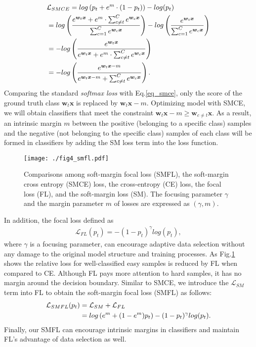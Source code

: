 \documentclass{article}
\begin{document}
{\myfont
	\begin{align}
	& \mathcal{L}_{SMCE}
	= log\left( p_t+e^m \cdot (1-p_t)\right)-log(p_t) \nonumber\\
	& = log\left( \frac{e^{\bm{w}_t\bm{x}}+e^m \cdot\sum_{c\neq t}^{C}e^{\bm{w}_c\bm{x}}}{\sum_{c=1}^{C} e^{\bm{w}_c\bm{x}}} \right) - log\left( \frac{e^{\bm{w}_t\bm{x}}}{\sum_{c=1}^{C} e^{\bm{w}_c\bm{x}}}\right) \notag\\
	& = -log \left( \frac{e^{\bm{w}_t\bm{x}}}{e^{\bm{w}_t\bm{x}}+e^m \cdot\sum_{c\neq t}^{C}e^{\bm{w}_c\bm{x}}}\right) \nonumber\\
	& = -log \left( \frac{e^{\bm{w}_t\bm{x}-m}}{e^{\bm{w}_t\bm{x}-m} + \sum_{c\neq t}^{C}e^{\bm{w}_c\bm{x}}}\right).
	\label{eq_smce}
	\end{align}
}Comparing the standard \textit{softmax loss} with Eq.\ref{eq_smce}, only the score of the ground truth class $ \bm{w}_t\bm{x} $ is replaced by $ \bm{w}_t\bm{x}-m $. Optimizing model with SMCE, we will obtain classifiers that meet the constraint {\myfont$ \bm{w}_t\bm{x}-m \geq \bm{w}_{c\neq t}\bm{x}  $}. As a result, an intrinsic margin $ m  $ between the positive (belonging to a specific class) samples and the negative (not belonging to the specific class) samples of each class will be formed in classifiers by adding the SM loss term into the loss function.

\begin{figure}[tbp]
	\centering
	\texttt{[image: ./fig4\_smfl.pdf]}
	\caption{Comparisons among soft-margin focal loss (SMFL), the soft-margin cross entropy (SMCE) loss, the cross-entropy (CE) loss, the focal loss (FL), and the soft-margin loss (SM). The focusing parameter $ \gamma $ and the margin parameter $ m $ of losses are expressed as $ (\gamma, m) $.}
	\label{fig4}
\end{figure}

In addition, the focal loss \cite{DBLP:conf/iccv/LinGGHD17} defined as
{\myfont
	\begin{align}
	\mathcal{L}_{FL}(p_t) = -(1-p_t)^\gamma log(p_t),
	\end{align}
}where $ \gamma $ is a focusing parameter, can encourage adaptive data selection without any damage to the  original model structure and training processes. As Fig.\ref{fig4} shows the relative loss for well-classified easy samples is reduced by FL when compared to CE. Although FL pays more attention to hard samples, it has no margin around the decision boundary. Similar to SMCE, we introduce the {\myfont$ \mathcal{L}_{SM} $} term into FL to obtain the soft-margin focal loss (SMFL) as follows:
{\myfont
	\begin{align}
	\mathcal{L}_{SMFL}(p_t) & = \mathcal{L}_{SM} + \mathcal{L}_{FL}\\
	& = log\left( e^m+(1-e^m)p_t\right)-(1-p_t)^{\gamma}log(p_t).  \notag
	\end{align}
}Finally, our SMFL can encourage intrinsic margins in classifiers and maintain FL's advantage of data selection as well.
\end{document}
